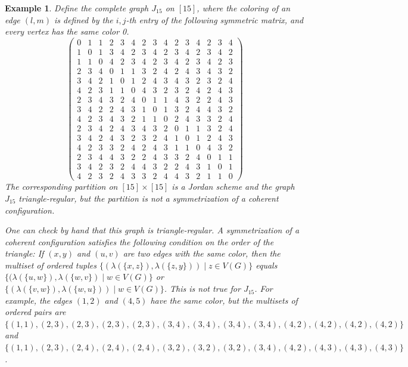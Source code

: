 \documentclass[a4paper, 11pt]{amsart}
\numberwithin{theorem}{section}
\newtheorem{example}[theorem]{Example}
\begin{document}
\begin{example}{\cite{KRM2019properjordanschemesexist}}
    Define the complete graph $J_{15}$ on $[15]$, where the coloring of an edge $(l,m)$ is defined by the $i,j$-th entry of the following symmetric matrix, and every vertex has the same color 0.
    \[
    \begin{pmatrix}
        0 & 1 & 1 & 2 & 3 & 4 & 2 & 3 & 4 & 2 & 3 & 4 & 2 & 3 & 4 \\
        1 & 0 & 1 & 3 & 4 & 2 & 3 & 4 & 2 & 3 & 4 & 2 & 3 & 4 & 2 \\
        1 & 1 & 0 & 4 & 2 & 3 & 4 & 2 & 3 & 4 & 2 & 3 & 4 & 2 & 3 \\     
        2 & 3 & 4 & 0 & 1 & 1 & 3 & 2 & 4 & 2 & 4 & 3 & 4 & 3 & 2 \\
        3 & 4 & 2 & 1 & 0 & 1 & 2 & 4 & 3 & 4 & 3 & 2 & 3 & 2 & 4 \\
        4 & 2 & 3 & 1 & 1 & 0 & 4 & 3 & 2 & 3 & 2 & 4 & 2 & 4 & 3 \\
        2 & 3 & 4 & 3 & 2 & 4 & 0 & 1 & 1 & 4 & 3 & 2 & 2 & 4 & 3 \\
        3 & 4 & 2 & 2 & 4 & 3 & 1 & 0 & 1 & 3 & 2 & 4 & 4 & 3 & 2 \\
        4 & 2 & 3 & 4 & 3 & 2 & 1 & 1 & 0 & 2 & 4 & 3 & 3 & 2 & 4 \\
        2 & 3 & 4 & 2 & 4 & 3 & 4 & 3 & 2 & 0 & 1 & 1 & 3 & 2 & 4 \\
        3 & 4 & 2 & 4 & 3 & 2 & 3 & 2 & 4 & 1 & 0 & 1 & 2 & 4 & 3 \\
        4 & 2 & 3 & 3 & 2 & 4 & 2 & 4 & 3 & 1 & 1 & 0 & 4 & 3 & 2 \\
        2 & 3 & 4 & 4 & 3 & 2 & 2 & 4 & 3 & 3 & 2 & 4 & 0 & 1 & 1 \\
        3 & 4 & 2 & 3 & 2 & 4 & 4 & 3 & 2 & 2 & 4 & 3 & 1 & 0 & 1 \\
        4 & 2 & 3 & 2 & 4 & 3 & 3 & 2 & 4 & 4 & 3 & 2 & 1 & 1 & 0
    \end{pmatrix}
    \]
    The corresponding partition on $[15] \times [15]$ is a Jordan scheme and the graph $J_{15}$ triangle-regular, but the partition is not a symmetrization of a coherent configuration.

    One can check by hand that this graph is triangle-regular. A
    symmetrization of a coherent configuration satisfies the following
    condition on the order of the triangle: If $(x,y)$ and $(u,v)$ are
    two edges with the same color, then the multiset of ordered tuples
    $\{(\lambda(\{x,z\}), \lambda(\{z,y\})) \mid z \in V(G)\}$ equals
    $\{(\lambda(\{u,w\}), \lambda(\{w,v\}) \mid w \in V(G)\}$ or
    $\{(\lambda(\{v,w\}), \lambda(\{w,u\})) \mid w \in V(G)\}$. This is not
    true for $J_{15}$. For example, the edges $(1,2)$ and $(4,5)$ have the same color, but the multisets of ordered pairs are $\{(1,1),(2,3),(2,3),(2,3),(2,3),(3,4),(3,4),(3,4),(3,4),(4,2),(4,2),(4,2),(4,2)\}$ and $\{(1,1),(2,3),(2,4),(2,4),(2,4),(3,2),(3,2),(3,2),(3,4),(4,2),(4,3),(4,3),(4,3)\} $.
\end{example}
\end{document}

